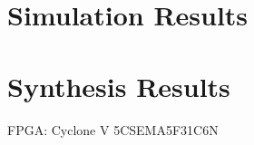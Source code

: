 \documentclass[a4paper, 10pt, titlepage]{article}
\begin{document}
\section{Simulation Results}



\section{Synthesis Results}

FPGA: Cyclone V 5CSEMA5F31C6N
\end{document}

